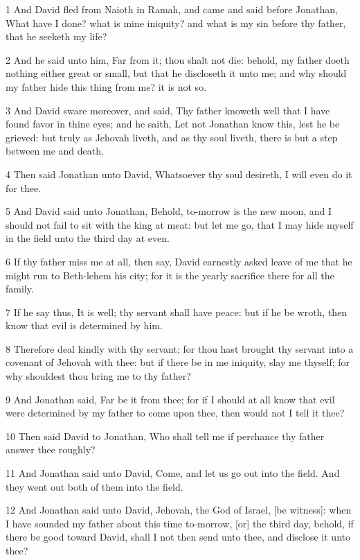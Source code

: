 \par 1 And David fled from Naioth in Ramah, and came and said before Jonathan, What have I done? what is mine iniquity? and what is my sin before thy father, that he seeketh my life?
\par 2 And he said unto him, Far from it; thou shalt not die: behold, my father doeth nothing either great or small, but that he discloseth it unto me; and why should my father hide this thing from me? it is not so.
\par 3 And David sware moreover, and said, Thy father knoweth well that I have found favor in thine eyes; and he saith, Let not Jonathan know this, lest he be grieved: but truly as Jehovah liveth, and as thy soul liveth, there is but a step between me and death.
\par 4 Then said Jonathan unto David, Whatsoever thy soul desireth, I will even do it for thee.
\par 5 And David said unto Jonathan, Behold, to-morrow is the new moon, and I should not fail to sit with the king at meat: but let me go, that I may hide myself in the field unto the third day at even.
\par 6 If thy father miss me at all, then say, David earnestly asked leave of me that he might run to Beth-lehem his city; for it is the yearly sacrifice there for all the family.
\par 7 If he say thus, It is well; thy servant shall have peace: but if he be wroth, then know that evil is determined by him.
\par 8 Therefore deal kindly with thy servant; for thou hast brought thy servant into a covenant of Jehovah with thee: but if there be in me iniquity, slay me thyself; for why shouldest thou bring me to thy father?
\par 9 And Jonathan said, Far be it from thee; for if I should at all know that evil were determined by my father to come upon thee, then would not I tell it thee?
\par 10 Then said David to Jonathan, Who shall tell me if perchance thy father answer thee roughly?
\par 11 And Jonathan said unto David, Come, and let us go out into the field. And they went out both of them into the field.
\par 12 And Jonathan said unto David, Jehovah, the God of Israel, [be witness]: when I have sounded my father about this time to-morrow, [or] the third day, behold, if there be good toward David, shall I not then send unto thee, and disclose it unto thee?
